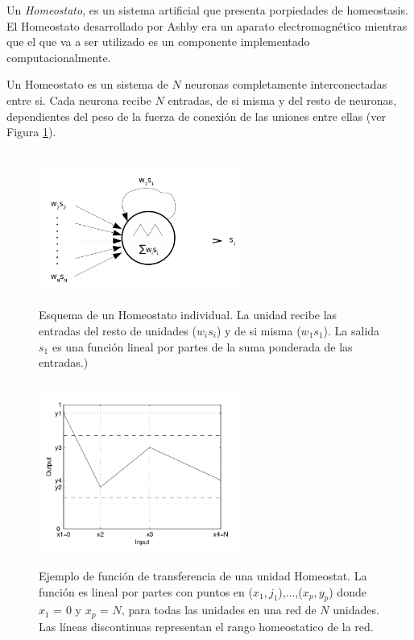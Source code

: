 Un \textit{Homeostato}, es un sistema artificial que presenta porpiedades de homeostasis. El Homeostato desarrollado por Ashby era un aparato
electromagnético mientras que el que va a ser utilizado es un componente implementado computacionalmente.

Un Homeostato es un sistema de $N$ neuronas completamente interconectadas entre si. Cada neurona recibe $N$ entradas, de si misma y del resto de neuronas,
dependientes del peso de la fuerza de conexión de las uniones entre ellas (ver Figura \ref{fig:figuraHomeostatSchema}).

\begin{figure}[!h]
    \centering
    \includegraphics[width=0.6\textwidth,height=5cm]{Imagenes/HomeostatSchema}
    \caption{Esquema de un Homeostato individual. La unidad recibe las entradas del resto de unidades ($w_{i}s_{i}$) y de si misma ($w_{1}s_{1}$). La salida $s_{1}$ es una función lineal por partes
		de la suma ponderada de las entradas.)}
    \label{fig:figuraHomeostatSchema}
\end{figure}

\begin{figure}[!h]
    \centering
    \includegraphics[width=0.6\textwidth,height=6cm]{Imagenes/HomeostatTransfer}
    \caption{Ejemplo de función de transferencia de una unidad Homeostat. La función es lineal por partes con puntos en ($x_{1},j_{1}$),...,($x_{p},y_{p}$) donde $x_{1}$ = 0 y $x_{p}$ = $N$, para todas las
		unidades en una red de $N$ unidades. Las líneas discontinuas representan el rango homeostatico de la red.}
    \label{fig:homeostatTransferFunction}
\end{figure}

